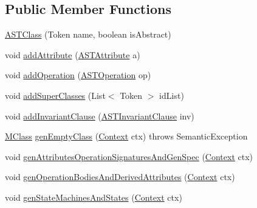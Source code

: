 \subsection*{Public Member Functions}
\begin{DoxyCompactItemize}
\item 
\hyperlink{classorg_1_1tzi_1_1use_1_1parser_1_1use_1_1_a_s_t_class_a05e5d9481eb60e3ded656b372680aa4a}{A\-S\-T\-Class} (Token name, boolean is\-Abstract)
\item 
void \hyperlink{classorg_1_1tzi_1_1use_1_1parser_1_1use_1_1_a_s_t_class_a520badd11b2b8420a41280f368a591bd}{add\-Attribute} (\hyperlink{classorg_1_1tzi_1_1use_1_1parser_1_1use_1_1_a_s_t_attribute}{A\-S\-T\-Attribute} a)
\item 
void \hyperlink{classorg_1_1tzi_1_1use_1_1parser_1_1use_1_1_a_s_t_class_a124839b6f6e194747f91d9bd2340ed18}{add\-Operation} (\hyperlink{classorg_1_1tzi_1_1use_1_1parser_1_1use_1_1_a_s_t_operation}{A\-S\-T\-Operation} op)
\item 
void \hyperlink{classorg_1_1tzi_1_1use_1_1parser_1_1use_1_1_a_s_t_class_a54f03532648743352a4569f69b610e45}{add\-Super\-Classes} (List$<$ Token $>$ id\-List)
\item 
void \hyperlink{classorg_1_1tzi_1_1use_1_1parser_1_1use_1_1_a_s_t_class_a5402947094ef86074820beae5a5628dc}{add\-Invariant\-Clause} (\hyperlink{classorg_1_1tzi_1_1use_1_1parser_1_1use_1_1_a_s_t_invariant_clause}{A\-S\-T\-Invariant\-Clause} inv)
\item 
\hyperlink{interfaceorg_1_1tzi_1_1use_1_1uml_1_1mm_1_1_m_class}{M\-Class} \hyperlink{classorg_1_1tzi_1_1use_1_1parser_1_1use_1_1_a_s_t_class_a28a208744f4abc1660188e7cbf596b59}{gen\-Empty\-Class} (\hyperlink{classorg_1_1tzi_1_1use_1_1parser_1_1_context}{Context} ctx)  throws Semantic\-Exception     
\item 
void \hyperlink{classorg_1_1tzi_1_1use_1_1parser_1_1use_1_1_a_s_t_class_ab4419ba1a0b582f023f303a57eb9b4f4}{gen\-Attributes\-Operation\-Signatures\-And\-Gen\-Spec} (\hyperlink{classorg_1_1tzi_1_1use_1_1parser_1_1_context}{Context} ctx)
\item 
void \hyperlink{classorg_1_1tzi_1_1use_1_1parser_1_1use_1_1_a_s_t_class_a8cb2de411bf1c5b6c2f7bb58ebf36f06}{gen\-Operation\-Bodies\-And\-Derived\-Attributes} (\hyperlink{classorg_1_1tzi_1_1use_1_1parser_1_1_context}{Context} ctx)
\item 
void \hyperlink{classorg_1_1tzi_1_1use_1_1parser_1_1use_1_1_a_s_t_class_aea79659b2c656b661cae8ad65f2df5fc}{gen\-State\-Machines\-And\-States} (\hyperlink{classorg_1_1tzi_1_1use_1_1parser_1_1_context}{Context} ctx)

\end{DoxyCompactItemize}
